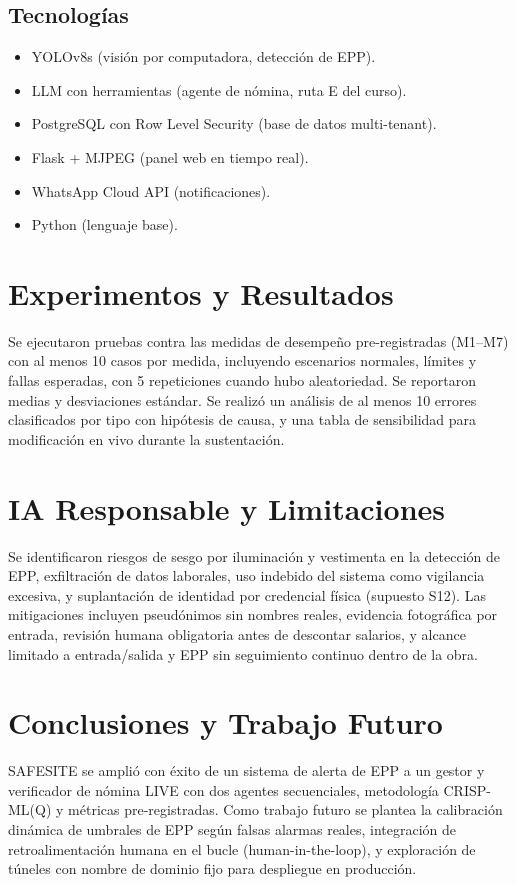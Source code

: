 \documentclass[conference,spanish]{IEEEtran}
\begin{document}
\subsection{Tecnologías}
\begin{itemize}
    \item YOLOv8s (visión por computadora, detección de EPP).
    \item LLM con herramientas (agente de nómina, ruta E del curso).
    \item PostgreSQL con Row Level Security (base de datos multi-tenant).
    \item Flask + MJPEG (panel web en tiempo real).
    \item WhatsApp Cloud API (notificaciones).
    \item Python (lenguaje base).
\end{itemize}

\section{Experimentos y Resultados}
Se ejecutaron pruebas contra las medidas de desempeño pre-registradas (M1--M7) con al menos 10 casos por medida, incluyendo escenarios normales, límites y fallas esperadas, con 5 repeticiones cuando hubo aleatoriedad. Se reportaron medias y desviaciones estándar. Se realizó un análisis de al menos 10 errores clasificados por tipo con hipótesis de causa, y una tabla de sensibilidad para modificación en vivo durante la sustentación.

\section{IA Responsable y Limitaciones}
Se identificaron riesgos de sesgo por iluminación y vestimenta en la detección de EPP, exfiltración de datos laborales, uso indebido del sistema como vigilancia excesiva, y suplantación de identidad por credencial física (supuesto S12). Las mitigaciones incluyen pseudónimos sin nombres reales, evidencia fotográfica por entrada, revisión humana obligatoria antes de descontar salarios, y alcance limitado a entrada/salida y EPP sin seguimiento continuo dentro de la obra.

\section{Conclusiones y Trabajo Futuro}
SAFESITE se amplió con éxito de un sistema de alerta de EPP a un gestor y verificador de nómina LIVE con dos agentes secuenciales, metodología CRISP-ML(Q) y métricas pre-registradas. Como trabajo futuro se plantea la calibración dinámica de umbrales de EPP según falsas alarmas reales, integración de retroalimentación humana en el bucle (human-in-the-loop), y exploración de túneles con nombre de dominio fijo para despliegue en producción.
\end{document}

